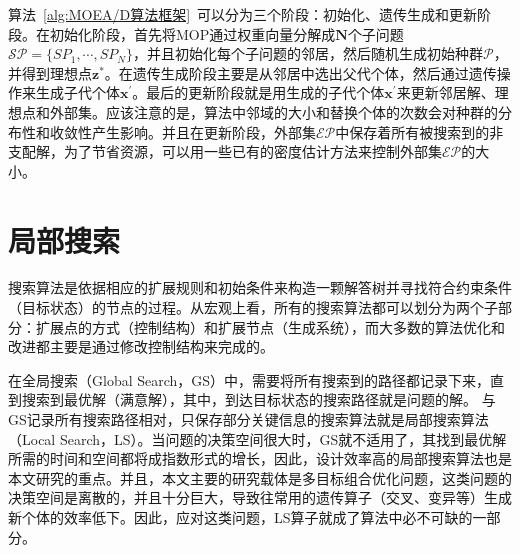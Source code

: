 \par
算法~\ref{alg:MOEA/D算法框架}~可以分为三个阶段：初始化、遗传生成和更新阶段。在初始化阶段，首先将MOP通过权重向量分解成$\mathbf{N}$个子问题$\mathcal{SP} = \{ SP_1, \cdots, SP_N \}$，并且初始化每个子问题的邻居，然后随机生成初始种群$\mathcal{P}$，并得到理想点$\mathbf{z}^*$。在遗传生成阶段主要是从邻居中选出父代个体，然后通过遗传操作来生成子代个体$\mathbf{x}^{'}$。最后的更新阶段就是用生成的子代个体$\mathbf{x}^{'}$来更新邻居解、理想点和外部集。应该注意的是，算法中邻域的大小和替换个体的次数会对种群的分布性和收敛性产生影响。并且在更新阶段，外部集$\mathcal{EP}$中保存着所有被搜索到的非支配解，为了节省资源，可以用一些已有的密度估计方法来控制外部集$\mathcal{EP}$的大小。

\section{局部搜索}
\label{sec:背景介绍:局部搜索}
搜索算法是依据相应的扩展规则和初始条件来构造一颗解答树并寻找符合约束条件（目标状态）的节点的过程。从宏观上看，所有的搜索算法都可以划分为两个子部分：扩展点的方式（控制结构）和扩展节点（生成系统），而大多数的算法优化和改进都主要是通过修改控制结构来完成的。
\par
在全局搜索（Global Search，GS）中，需要将所有搜索到的路径都记录下来，直到搜索到最优解（满意解），其中，到达目标状态的搜索路径就是问题的解。
与GS记录所有搜索路径相对，只保存部分关键信息的搜索算法就是局部搜索算法（Local Search，LS）。当问题的决策空间很大时，GS就不适用了，其找到最优解所需的时间和空间都将成指数形式的增长，因此，设计效率高的局部搜索算法也是本文研究的重点。并且，本文主要的研究载体是多目标组合优化问题，这类问题的决策空间是离散的，并且十分巨大，导致往常用的遗传算子（交叉、变异等）生成新个体的效率低下。因此，应对这类问题，LS算子就成了算法中必不可缺的一部分。

